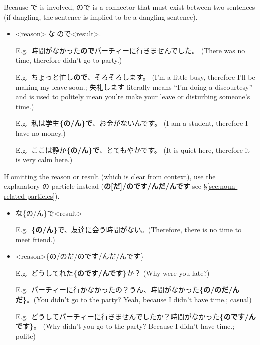 \documentclass[../nihongo-gakushuu-kyouzai-grammar.tex]{subfiles}
\begin{document}
\begin{itemize}
    Because で is involved, ので is a connector that must exist between two sentences (if dangling, the sentence is implied to be a dangling sentence).
    \begin{itemize}
        \item <reason>[な]ので<result>.


        E.g.\ 時間がなかった\textbf{ので}パーチィーに行きませんでした。 (There was no time, therefore didn't go to party.)

        E.g.\ ちょっと忙し\textbf{ので}、そろそろします。 (I'm a little busy, therefore I'll be making my leave soon.; 失礼します literally means ``I'm doing a discourtesy'' and is used to politely mean you're make your leave or disturbing someone's time.)

        E.g.\ 私は学生\textbf{\{の/ん\}で}、お金がないんです。 (I am a student, therefore I have no money.)

        E.g.\ ここは静か\textbf{\{の/ん\}で}、とてもやかです。 (It is quiet here, therefore it is very calm here.)
    \end{itemize}

    If omitting the reason or result (which is clear from context), use the explanatory-の particle instead (\textbf{の[だ]/のです/んだ/んです} see \S\ref{sec:noun-related-particles}).

    \begin{itemize}
        \item な\{の/ん\}で<result>


        E.g.\ \textbf{\{の/ん\}}で、友達に会う時間がない。(Therefore, there is no time to meet friend.)

        \item <reason>\{の/のだ/のです/んだ/んです\}

        E.g.\ どうしてれた\textbf{\{のです/んです\}}か？ (Why were you late?)

        E.g.\ パーチィーに行かなかったの？うん、時間がなかった\textbf{\{の/のだ/んだ\}}。(You didn't go to the party? Yeah, because I didn't have time.; casual)

        E.g.\ どうしてパーチィーに行きませんでしたか？時間がなかった\textbf{\{のです/んです\}}。 (Why didn't you go to the party? Because I didn't have time.; polite)
    \end{itemize}

\end{itemize}
\end{document}
